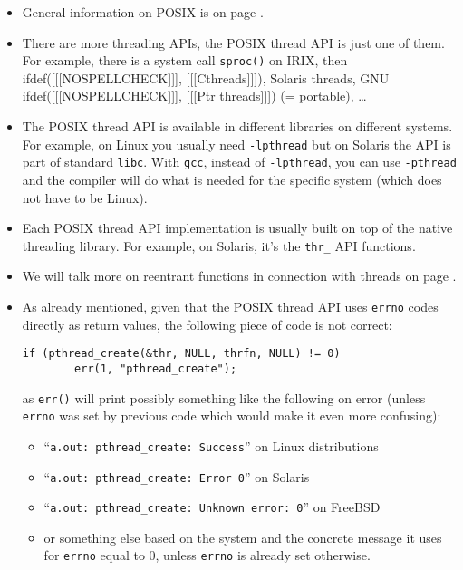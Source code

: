 \begin{itemize}
\item General information on POSIX is on page \pageref{POSIX}.
\item There are more threading APIs, the POSIX thread API is just one of them.
For example, there is a system call \texttt{sproc()} on IRIX, then
ifdef([[[NOSPELLCHECK]]], [[[Cthreads]]]),
Solaris threads, GNU ifdef([[[NOSPELLCHECK]]], [[[Ptr threads]]]) (= portable),
\dots
\item The POSIX thread API is available in different libraries on different
systems.  For example, on Linux you usually need \texttt{-lpthread} but on
Solaris the API is part of standard \texttt{libc}.  With \texttt{gcc}, instead
of \texttt{-lpthread}, you can use \texttt{-pthread} and the compiler will do
what is needed for the specific system (which does not have to be Linux).
\item Each POSIX thread API implementation is usually built on top of the native
threading library.  For example, on Solaris, it's the \texttt{thr\_} API
functions.
\item We will talk more on reentrant functions in connection with threads on
page \pageref{THREADSAFE}.
\item As already mentioned, given that the POSIX thread API uses \texttt{errno}
codes directly as return values, the following piece of code is not correct:

\begin{verbatim}
if (pthread_create(&thr, NULL, thrfn, NULL) != 0)
        err(1, "pthread_create");
\end{verbatim}

as \texttt{err()} will print possibly something like the following on error
(unless \texttt{errno} was set by previous code which would make it even more
confusing):

\begin{itemize}
\item ``\texttt{a.out: pthread\_create: Success}'' on Linux distributions
\item ``\texttt{a.out: pthread\_create: Error 0}'' on Solaris
\item ``\texttt{a.out: pthread\_create: Unknown error: 0}'' on FreeBSD
\item or something else based on the system and the concrete message it uses for
\texttt{errno} equal to 0, unless \texttt{errno} is already set otherwise.
\end{itemize}


\end{itemize}

